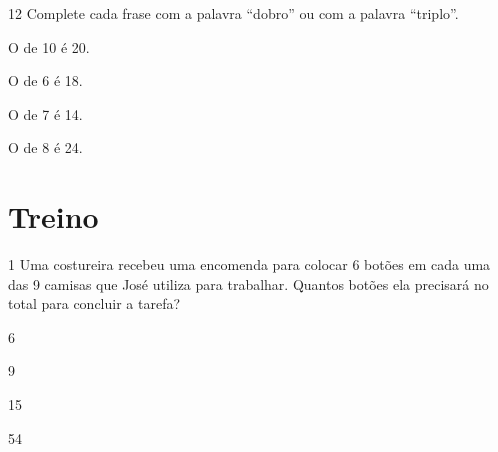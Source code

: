 \num{12} Complete cada frase com a palavra ``dobro'' ou com a palavra ``triplo''.

\begin{escolha}
\item
  O  de 10 é 20.
\item
  O  de 6 é 18.
\item
  O  de 7 é 14.
\item
  O  de 8 é 24.
\end{escolha}

\pagebreak

\section*{Treino}

\num{1} Uma costureira recebeu uma encomenda para colocar 6 botões em
cada uma das 9 camisas que José utiliza para trabalhar. Quantos botões
ela precisará no total para concluir a tarefa?

\begin{escolha}
    \item 6
    \item 9
    \item 15
    \item 54
\end{escolha}


